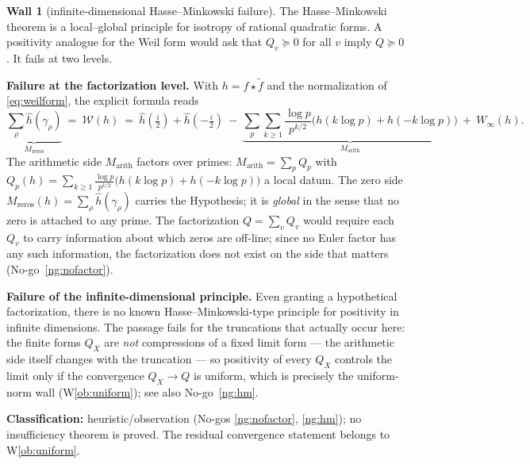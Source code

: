 \documentclass[11pt]{amsart}
\theoremstyle{definition}
\theoremstyle{remark}
\theoremstyle{definition}
\newtheorem{obstruction}{Wall}[section]
\begin{document}
\begin{obstruction}[infinite-dimensional Hasse--Minkowski failure]\label{ob:hassemink}
The Hasse--Minkowski theorem is a local--global principle for isotropy of rational quadratic forms. A
positivity analogue for the Weil form would ask that $Q_v\succeq0$ for all $v$ imply $Q\succeq0$. It fails
at two levels.

\textbf{Failure at the factorization level.} With $h=f\star\tilde f$ and the normalization of
\eqref{eq:weilform}, the explicit formula reads
\[
   \underbrace{\sum_\rho \widehat h(\gamma_\rho)}_{M_{\mathrm{zeros}}}\ =\ \mathcal W(h)\ =\
   \widehat h(\tfrac i2)+\widehat h(-\tfrac i2)
   \ -\ \underbrace{\sum_p\sum_{k\ge1}\frac{\log p}{p^{k/2}}\bigl(h(k\log p)+h(-k\log p)\bigr)}_{M_{\mathrm{arith}}}
   \ +\ W_\infty(h).
\]
The arithmetic side $M_{\mathrm{arith}}$ factors over primes:
$M_{\mathrm{arith}}=\sum_p Q_p$ with $Q_p(h)=\sum_{k\ge1}\frac{\log p}{p^{k/2}}\bigl(h(k\log p)+h(-k\log p)\bigr)$ a
local datum. The zero side $M_{\mathrm{zeros}}(h)=\sum_\rho\widehat h(\gamma_\rho)$ carries the
Hypothesis; it is \emph{global} in the sense that no zero is attached to any prime. The factorization
$Q=\sum_v Q_v$ would require each $Q_v$ to carry information about which zeros are off-line; since no
Euler factor has any such information, the factorization does not exist on the side that matters
(No-go~\ref{ng:nofactor}).

\textbf{Failure of the infinite-dimensional principle.} Even granting a hypothetical factorization, there
is no known Hasse--Minkowski-type principle for positivity in infinite dimensions. The passage fails
for the truncations that actually occur here: the finite forms $Q_X$ are \emph{not} compressions of a
fixed limit form --- the arithmetic side itself changes with the truncation --- so positivity of every
$Q_X$ controls the limit only if the convergence $Q_X\to Q$ is uniform, which is precisely the
uniform-norm wall (W\ref{ob:uniform}); see also No-go~\ref{ng:hm}.

\smallskip\noindent\textbf{Classification:} heuristic/observation (No-gos \ref{ng:nofactor},
\ref{ng:hm}); no insufficiency theorem is proved. The residual convergence statement belongs to
W\ref{ob:uniform}.
\end{obstruction}
\end{document}
